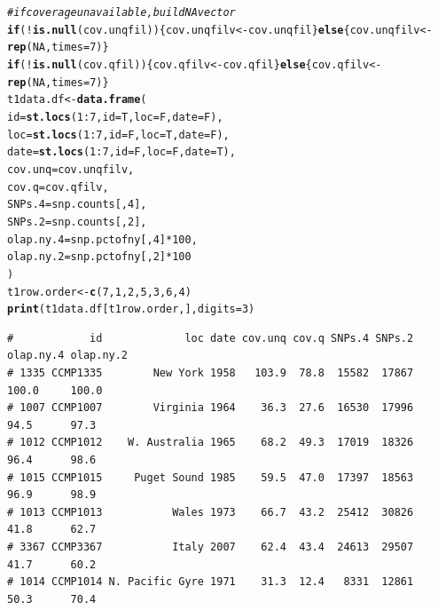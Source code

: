 \documentclass{article}\usepackage[]{graphicx}\usepackage[]{color}
\makeatletter
\newcommand{\hlnum}[1]{\textcolor[rgb]{0.686,0.059,0.569}{#1}}%
\newcommand{\hlcom}[1]{\textcolor[rgb]{0.678,0.584,0.686}{\textit{#1}}}%
\newcommand{\hlopt}[1]{\textcolor[rgb]{0,0,0}{#1}}%
\newcommand{\hlstd}[1]{\textcolor[rgb]{0.345,0.345,0.345}{#1}}%
\newcommand{\hlkwa}[1]{\textcolor[rgb]{0.161,0.373,0.58}{\textbf{#1}}}%
\newcommand{\hlkwb}[1]{\textcolor[rgb]{0.69,0.353,0.396}{#1}}%
\newcommand{\hlkwc}[1]{\textcolor[rgb]{0.333,0.667,0.333}{#1}}%
\newcommand{\hlkwd}[1]{\textcolor[rgb]{0.737,0.353,0.396}{\textbf{#1}}}%
\newenvironment{kframe}{%
 \def\at@end@of@kframe{}%
 \ifinner\ifhmode%
  \def\at@end@of@kframe{\end{minipage}}%
  \begin{minipage}{\columnwidth}%
 \fi\fi%
 \def\FrameCommand##1{\hskip\@totalleftmargin \hskip-\fboxsep
 \colorbox{shadecolor}{##1}\hskip-\fboxsep
     \hskip-\linewidth \hskip-\@totalleftmargin \hskip\columnwidth}%
 \MakeFramed {\advance\hsize-\width
   \@totalleftmargin\z@ \linewidth\hsize
   \@setminipage}}%
 {\par\unskip\endMakeFramed%
 \at@end@of@kframe}
\newenvironment{knitrout}{}{} %
\makeatother
\begin{document}
\begin{knitrout}\footnotesize
{}\color{fgcolor}\begin{kframe}
\begin{alltt}
\hlcom{# if coverage unavailable, build NA vector}
\hlkwa{if}\hlstd{(}\hlopt{!}\hlkwd{is.null}\hlstd{(cov.unqfil))\{cov.unqfilv} \hlkwb{<-} \hlstd{cov.unqfil\}} \hlkwa{else} \hlstd{\{cov.unqfilv} \hlkwb{<-} \hlkwd{rep}\hlstd{(}\hlnum{NA}\hlstd{,}\hlkwc{times}\hlstd{=}\hlnum{7}\hlstd{)\}}
\hlkwa{if}\hlstd{(}\hlopt{!}\hlkwd{is.null}\hlstd{(cov.qfil  ))\{cov.qfilv}   \hlkwb{<-} \hlstd{cov.qfil  \}} \hlkwa{else} \hlstd{\{cov.qfilv}   \hlkwb{<-} \hlkwd{rep}\hlstd{(}\hlnum{NA}\hlstd{,}\hlkwc{times}\hlstd{=}\hlnum{7}\hlstd{)\}}
\hlstd{t1data.df} \hlkwb{<-} \hlkwd{data.frame}\hlstd{(}
  \hlkwc{id}        \hlstd{=} \hlkwd{st.locs}\hlstd{(}\hlnum{1}\hlopt{:}\hlnum{7}\hlstd{,} \hlkwc{id}\hlstd{=T,} \hlkwc{loc}\hlstd{=F,} \hlkwc{date}\hlstd{=F),}
  \hlkwc{loc}       \hlstd{=} \hlkwd{st.locs}\hlstd{(}\hlnum{1}\hlopt{:}\hlnum{7}\hlstd{,} \hlkwc{id}\hlstd{=F,} \hlkwc{loc}\hlstd{=T,} \hlkwc{date}\hlstd{=F),}
  \hlkwc{date}      \hlstd{=} \hlkwd{st.locs}\hlstd{(}\hlnum{1}\hlopt{:}\hlnum{7}\hlstd{,} \hlkwc{id}\hlstd{=F,} \hlkwc{loc}\hlstd{=F,} \hlkwc{date}\hlstd{=T),}
  \hlkwc{cov.unq}   \hlstd{= cov.unqfilv,}
  \hlkwc{cov.q}     \hlstd{= cov.qfilv,}
  \hlkwc{SNPs.4}    \hlstd{= snp.counts[,}\hlnum{4}\hlstd{],}
  \hlkwc{SNPs.2}    \hlstd{= snp.counts[,}\hlnum{2}\hlstd{],}
  \hlkwc{olap.ny.4} \hlstd{= snp.pctofny[,}\hlnum{4}\hlstd{]}\hlopt{*}\hlnum{100}\hlstd{,}
  \hlkwc{olap.ny.2} \hlstd{= snp.pctofny[,}\hlnum{2}\hlstd{]}\hlopt{*}\hlnum{100}
\hlstd{)}
\hlstd{t1row.order} \hlkwb{<-} \hlkwd{c}\hlstd{(}\hlnum{7}\hlstd{,}\hlnum{1}\hlstd{,}\hlnum{2}\hlstd{,}\hlnum{5}\hlstd{,}\hlnum{3}\hlstd{,}\hlnum{6}\hlstd{,}\hlnum{4}\hlstd{)}
\hlkwd{print}\hlstd{(t1data.df[t1row.order,],}\hlkwc{digits}\hlstd{=}\hlnum{3}\hlstd{)}
\end{alltt}
\begin{verbatim}
#            id             loc date cov.unq cov.q SNPs.4 SNPs.2 olap.ny.4 olap.ny.2
# 1335 CCMP1335        New York 1958   103.9  78.8  15582  17867     100.0     100.0
# 1007 CCMP1007        Virginia 1964    36.3  27.6  16530  17996      94.5      97.3
# 1012 CCMP1012    W. Australia 1965    68.2  49.3  17019  18326      96.4      98.6
# 1015 CCMP1015     Puget Sound 1985    59.5  47.0  17397  18563      96.9      98.9
# 1013 CCMP1013           Wales 1973    66.7  43.2  25412  30826      41.8      62.7
# 3367 CCMP3367           Italy 2007    62.4  43.4  24613  29507      41.7      60.2
# 1014 CCMP1014 N. Pacific Gyre 1971    31.3  12.4   8331  12861      50.3      70.4
\end{verbatim}
\end{kframe}
\end{knitrout}
\end{document}
